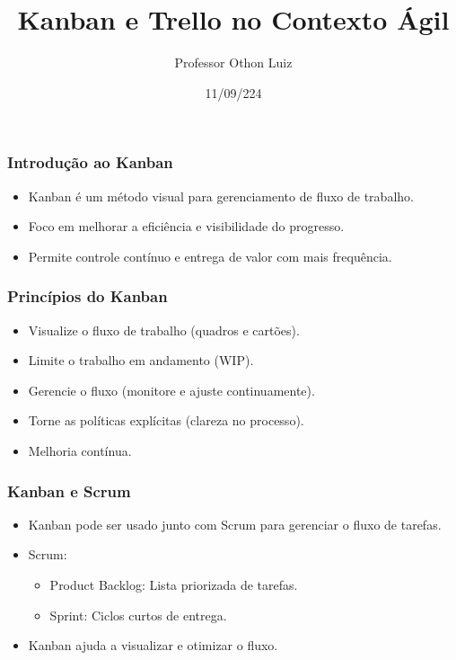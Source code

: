 \documentclass{beamer}
\title{Kanban e Trello no Contexto Ágil}
\author{Professor Othon Luiz}
\institute{Uni São Miguel}
\date{11/09/224}
\begin{document}
\begin{frame}
    \titlepage
\end{frame}

\begin{frame}
    \frametitle{Introdução ao Kanban}
    \begin{itemize}
        \item Kanban é um método visual para gerenciamento de fluxo de trabalho.
        \item Foco em melhorar a eficiência e visibilidade do progresso.
        \item Permite controle contínuo e entrega de valor com mais frequência.
    \end{itemize}
\end{frame}

\begin{frame}
    \frametitle{Princípios do Kanban}
    \begin{itemize}
        \item Visualize o fluxo de trabalho (quadros e cartões).
        \item Limite o trabalho em andamento (WIP).
        \item Gerencie o fluxo (monitore e ajuste continuamente).
        \item Torne as políticas explícitas (clareza no processo).
        \item Melhoria contínua.
    \end{itemize}
\end{frame}

\begin{frame}
    \frametitle{Kanban e Scrum}
    \begin{itemize}
        \item Kanban pode ser usado junto com Scrum para gerenciar o fluxo de tarefas.
        \item Scrum:
        \begin{itemize}
            \item Product Backlog: Lista priorizada de tarefas.
            \item Sprint: Ciclos curtos de entrega.
        \end{itemize}
        \item Kanban ajuda a visualizar e otimizar o fluxo.
    \end{itemize}
\end{frame}
\end{document}
